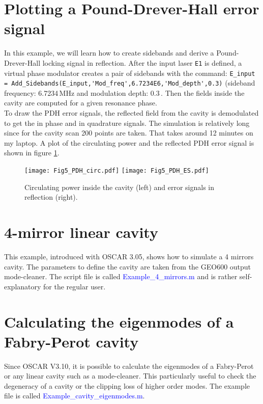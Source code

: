 \clearpage
\section{Plotting a Pound-Drever-Hall error signal} \label{ch4:ex_PDH}

In this example, we will learn how to create sidebands and derive a Pound-Drever-Hall locking signal in reflection. After the input laser \verb|E1| is defined, a virtual phase modulator creates a pair of sidebands with the command: \verb|E_input = Add_Sidebands(E_input,'Mod_freq',6.7234E6,'Mod_depth',0.3)| (sideband frequency: 6.7234\,MHz and modulation depth: 0.3\,. Then the fields inside the cavity are computed for a given resonance phase.\\

To draw the PDH error signals, the reflected field from the cavity is demodulated to get the in phase and in quadrature signals. The simulation is relatively long since for the cavity scan 200 points are taken. That takes around 12 minutes on my laptop. A plot of the circulating power and the reflected PDH error signal is shown in figure \ref{fig5:PDH}.

\begin{figure}
\begin{center}
\texttt{[image: Fig5\_PDH\_circ.pdf]}\hfill
\texttt{[image: Fig5\_PDH\_ES.pdf]}
\end{center}
\caption{\label{fig5:PDH} Circulating power inside the cavity (left) and error signals in reflection (right).}
\end{figure}

\section{4-mirror linear cavity} \label{ch4:ex_OMC}

This example, introduced with OSCAR 3.05, shows how to simulate a 4 mirrors cavity. The parameters to define the cavity are taken from the GEO600 output mode-cleaner. The script file is called \textcolor{blue}{Example\_4\_mirrors.m} and is rather self-explanatory for the regular user.

\section{Calculating the eigenmodes of a Fabry-Perot cavity} \label{ch4:ex_OMC}

Since OSCAR V3.10, it is possible to calculate the eigenmodes of a Fabry-Perot or any linear cavity such as a mode-cleaner. This particularly useful to check the degeneracy of a cavity or the clipping loss of higher order modes. The example file is called \textcolor{blue}{Example\_cavity\_eigenmodes.m}.

